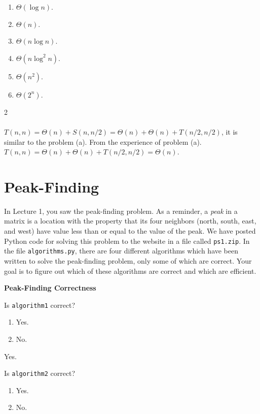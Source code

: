 \documentclass[12pt,twoside]{article}
\begin{document}
\begin{problems}
\begin{problemparts}
\begin{enumerate}
\item $\Theta(\log n)$.
\item $\Theta(n)$.
\item $\Theta(n \log n)$.
\item $\Theta(n \log^2 n)$.
\item $\Theta(n^2)$.
\item $\Theta(2^n)$.
\end{enumerate}

\ifsolution \solution{}
2
\\
\\
$T(n,n)= \Theta(n)+S(n,n/2)=\Theta(n)+\Theta(n)+T(n/2,n/2)$, it is similar to the problem (a). From the experience of problem (a). $T(n,n) = \Theta(n)+\Theta(n)+T(n/2,n/2) = \Theta(n)$.
\\
\fi

\end{problemparts}

\section*{Peak-Finding}

In Lecture 1,
you saw the peak-finding problem.
As a reminder,
a \emph{peak} in a matrix
is a location with the property that its four neighbors
(north, south, east, and west)
have value less than or equal to the value of the peak.
We have posted Python code for solving this problem
to the website in a file called \texttt{ps1.zip}.
In the file \texttt{algorithms.py},
there are four different algorithms
which have been written
to solve the peak-finding problem,
only some of which are correct.
Your goal is to figure out
which of these algorithms are correct
and which are efficient.

\problem {} \textbf{Peak-Finding Correctness}

\begin{problemparts}

\problempart {} Is \texttt{algorithm1} correct?
\begin{enumerate}
\item Yes.
\item No.
\end{enumerate}

\ifsolution \solution{}
Yes.
\fi

\problempart {} Is \texttt{algorithm2} correct?
\begin{enumerate}
\item Yes.
\item No.
\end{enumerate}


\end{problemparts}
\end{problems}
\end{document}
